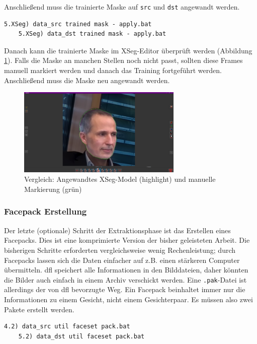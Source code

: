Anschließend muss die trainierte Maske auf \texttt{src} und \texttt{dst} angewandt werden.
\begin{lstlisting}[numbers=none,label={lst:xseg-apply}]
    5.XSeg) data_src trained mask - apply.bat
    5.XSeg) data_dst trained mask - apply.bat
\end{lstlisting}
Danach kann die trainierte Maske im XSeg-Editor überprüft werden (Abbildung \ref{fig:xseg-train-comparison}).
Falls die Maske an manchen Stellen noch nicht passt, sollten diese Frames manuell markiert werden und danach das Training fortgeführt werden.
Anschließend muss die Maske neu angewandt werden.

\begin{figure}
    \center
    \includegraphics[width=0.7\textwidth]{Bilder/DFL/XSegEditor-6-trained-draw-comparision}
    \caption{Vergleich: Angewandtes XSeg-Model (highlight) und manuelle Markierung (grün)}
    \label{fig:xseg-train-comparison}
\end{figure}

\subsubsection{Facepack Erstellung}
Der letzte (optionale) Schritt der Extraktionsphase ist das Erstellen eines Facepacks.
Dies ist eine komprimierte Version der bisher geleisteten Arbeit.
Die bisherigen Schritte erforderten vergleichsweise wenig Rechenleistung; durch Facepacks lassen sich die Daten einfacher auf z.B. einen stärkeren Computer übermitteln.
\gls{dfl} speichert alle Informationen in den Bilddateien, daher könnten die Bilder auch einfach in einem Archiv verschickt werden.
Eine \texttt{.pak}-Datei ist allerdings der von \gls{dfl} bevorzugte Weg.
Ein Facepack beinhaltet immer nur die Informationen zu einem Gesicht, nicht einem Gesichterpaar.
Es müssen also zwei Pakete erstellt werden.
\begin{lstlisting}[numbers=none,label={lst:facepack}]
    4.2) data_src util faceset pack.bat
    5.2) data_dst util faceset pack.bat
\end{lstlisting}
